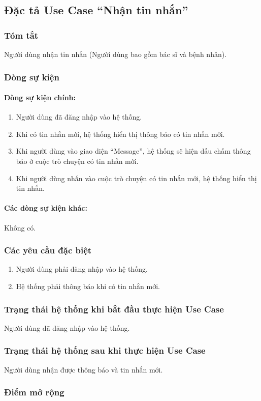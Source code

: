 \subsection{Đặc tả Use Case ``Nhận tin nhắn''}

\subsubsection{Tóm tắt}
Người dùng nhận tin nhắn (Người dùng bao gồm bác sĩ và bệnh nhân).

\subsubsection{Dòng sự kiện}
\paragraph{\textbf{Dòng sự kiện chính:}}
\begin{enumerate}
  \item Người dùng đã đăng nhập vào hệ thống.
  \item Khi có tin nhắn mới, hệ thống hiển thị thông báo có tin nhắn mới.
  \item Khi người dùng vào giao diện ``Message'', hệ thống sẽ hiện dấu chấm thông báo ở cuộc trò chuyện có tin nhắn mới.
  \item Khi người dùng nhấn vào cuộc trò chuyện có tin nhắn mới, hệ thống hiển thị tin nhắn.
\end{enumerate}

\paragraph{\textbf{Các dòng sự kiện khác:}}
Không có.

\subsubsection{Các yêu cầu đặc biệt}
\begin{enumerate}
  \item Người dùng phải đăng nhập vào hệ thống.
  \item Hệ thống phải thông báo khi có tin nhắn mới.
\end{enumerate}

\subsubsection{Trạng thái hệ thống khi bắt đầu thực hiện Use Case}
Người dùng đã đăng nhập vào hệ thống.

\subsubsection{Trạng thái hệ thống sau khi thực hiện Use Case}
Người dùng nhận được thông báo và tin nhắn mới.

\subsubsection{Điểm mở rộng}
